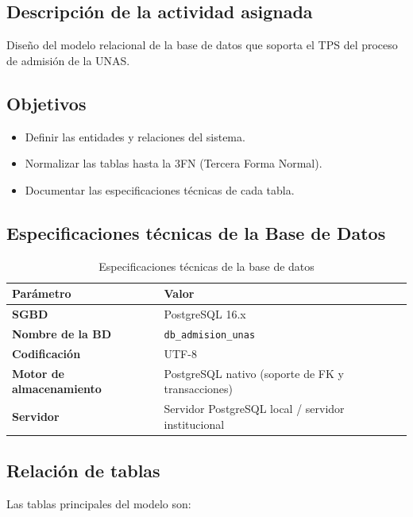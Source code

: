 \documentclass[12pt, a4paper]{report}
\begin{document}
\subsection{Descripción de la actividad asignada}

Diseño del modelo relacional de la base de datos que soporta el TPS del proceso de admisión de la UNAS.

\subsection{Objetivos}

\begin{itemize}[noitemsep]
  \item Definir las entidades y relaciones del sistema.
  \item Normalizar las tablas hasta la 3FN (Tercera Forma Normal).
  \item Documentar las especificaciones técnicas de cada tabla.
\end{itemize}

\subsection{Especificaciones técnicas de la Base de Datos}

\begin{table}[H]
  \centering
  \caption{Especificaciones técnicas de la base de datos}
  \label{tab:bdspec}
  \begin{tabular}{>{\bfseries}p{4cm} p{8cm}}
    \toprule
    Parámetro & Valor \\
    \midrule
    SGBD & PostgreSQL 16.x \\
    Nombre de la BD & \texttt{db\_admision\_unas} \\
    Codificación & UTF-8 \\
    Motor de almacenamiento & PostgreSQL nativo (soporte de FK y transacciones) \\
    Servidor & Servidor PostgreSQL local / servidor institucional \\
    \bottomrule
  \end{tabular}
\end{table}

\subsection{Relación de tablas}

Las tablas principales del modelo son:
\end{document}
